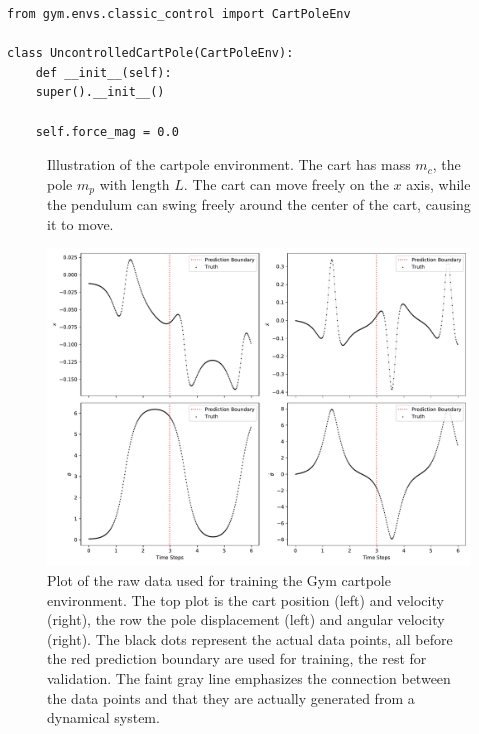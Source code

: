 			\begin{lstlisting}[caption={Modification of Gym's cartpole environment to get an uncontrolled cartpole.}, label=lst:uncontrolledCartPole]
from gym.envs.classic_control import CartPoleEnv

class UncontrolledCartPole(CartPoleEnv):
	def __init__(self):
	super().__init__()

	self.force_mag = 0.0
			\end{lstlisting}

			\begin{figure}
				\centering
				\tikzCartpole
				\caption{Illustration of the cartpole environment. The cart has mass \(m_c\), the pole \(m_p\) with length \(L\). The cart can move freely on the \(x\) axis, while the pendulum can swing freely around the center of the cart, causing it to move.}
				\label{fig:envCartpoleGymSketch}
			\end{figure}

			\begin{figure}
				\centering
				\includegraphics[width=\linewidth]{figures/experiments/environments/observations-cartpole-gym-N0.pdf}
				\caption{Plot of the raw data used for training the Gym cartpole environment. The top plot is the cart position (left) and velocity (right), the row the pole displacement (left) and angular velocity (right). The black dots represent the actual data points, all before the red prediction boundary are used for training, the rest for validation. The faint gray line emphasizes the connection between the data points and that they are actually generated from a dynamical system.}
				\label{fig:envCartpoleGym}
			\end{figure}

